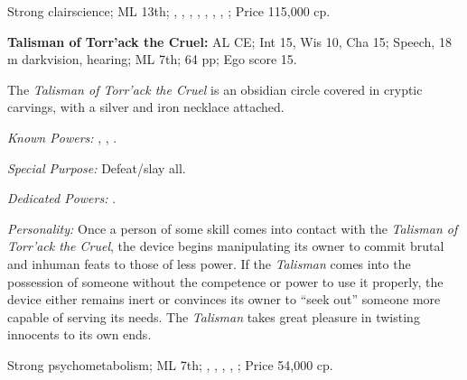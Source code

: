 Strong clairscience;
ML 13th;
,
,
,
,
,
,
,
;
Price 115,000 cp.




\textbf{Talisman of Torr'ack the Cruel:}
AL CE;
Int 15, Wis 10, Cha 15;
Speech, 18 m darkvision, hearing;
ML 7th;
64 pp;
Ego score 15.

The \emph{Talisman of Torr'ack the Cruel} is an obsidian circle covered in cryptic carvings, with a silver and iron necklace attached.

\textit{Known Powers:}
	, %
	, %
	. %

\textit{Special Purpose:} Defeat/slay all.

\textit{Dedicated Powers:}
	.  %

\textit{Personality:} Once a person of some skill comes into contact with the \emph{Talisman of Torr'ack the Cruel}, the device begins manipulating its owner to commit brutal and inhuman feats to those of less power. If the \emph{Talisman} comes into the possession of someone without the competence or power to use it properly, the device either remains inert or convinces its owner to ``seek out'' someone more capable of serving its needs. The \emph{Talisman} takes great pleasure in twisting innocents to its own ends.

Strong psychometabolism;
ML 7th;
,
,
,
,
;
Price 54,000 cp.

